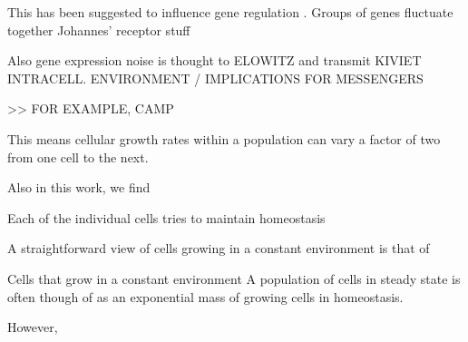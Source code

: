 This has been suggested to influence gene regulation \cite{Rosenfeld2005}.
Groups of genes fluctuate together \cite{Stewart-Ornstein2012}
Johannes' receptor stuff


Also gene expression noise is thought to ELOWITZ
and transmit KIVIET
INTRACELL. ENVIRONMENT / IMPLICATIONS FOR MESSENGERS 

>> FOR EXAMPLE, CAMP

%
This means cellular growth rates within a population can vary a factor of two from one cell to the next.

Also in this work, we find 



Each of the individual cells tries to maintain homeostasis 


A straightforward view of cells growing in a constant environment is that of 

Cells that grow in a constant environment 
A population of cells in steady state is often though of as an exponential mass of growing cells in homeostasis.
%

% 
However, 
